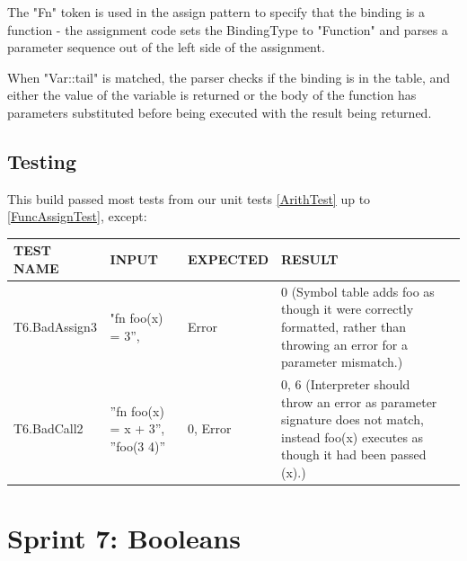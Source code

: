 \documentclass[a4paper, oneside, 11pt]{report}
\begin{document}
    The "Fn" token is used in the assign pattern to specify that the binding is a function - the assignment code sets the BindingType to "Function" and parses a parameter sequence out of the left side of the assignment.

    When "Var::tail" is matched, the parser checks if the binding is in the table, and either the value of the variable is returned or the body of the function has parameters substituted before being executed with the result being returned.

    \subsection{Testing}

    This build passed most tests from our unit tests \ref{ArithTest} up to \ref{FuncAssignTest}, except:
    \begin{center}
        \begin{tabular}{|p{1.5in}|p{1.5in}|p{1in}|p{1.6in}|p{2.4in}|}
            \hline
            TEST NAME & INPUT & EXPECTED & RESULT \\
            \hline
            T6.BadAssign3 & "fn foo(x) = 3”, & Error & 0 (Symbol table adds foo as though it were correctly formatted, rather than throwing an error for a parameter mismatch.) \\
            \hline
            T6.BadCall2 & ”fn foo(x) = x + 3”, ”foo(3 4)” & 0, Error & 0, 6 (Interpreter should throw an error as parameter signature does not match, instead foo(x) executes as though it had been passed (x).) \\
            \hline
        \end{tabular}
    \end{center}

    \clearpage
    \section{Sprint 7: Booleans }
\end{document}
